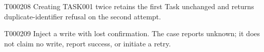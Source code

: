 \documentclass[11pt,a4paper]{article}
\begin{document}
\par{}\hypertarget{AC-TASK-CREATE-DUPLICATE}{}
\begin{atlasparagraph}{T000208}
Creating TASK001 twice retains the first Task unchanged and returns duplicate-identifier refusal on the second attempt.
\end{atlasparagraph}
\par{}\hypertarget{AC-TASK-CREATE-UNKNOWN}{}
\begin{atlasparagraph}{T000209}
Inject a write with lost confirmation. The case reports unknown; it does not claim no write, report success, or initiate a retry.
\end{atlasparagraph}
\par{}
\end{document}
